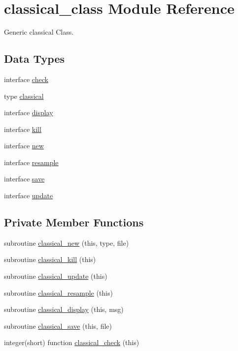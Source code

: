 \hypertarget{classclassical__class}{\section{classical\-\_\-class Module Reference}
\label{classclassical__class}
}


Generic classical Class.  


\subsection*{Data Types}
\begin{DoxyCompactItemize}
\item 
interface \hyperlink{interfaceclassical__class_1_1check}{check}
\item 
type \hyperlink{structclassical__class_1_1classical}{classical}
\item 
interface \hyperlink{interfaceclassical__class_1_1display}{display}
\item 
interface \hyperlink{interfaceclassical__class_1_1kill}{kill}
\item 
interface \hyperlink{interfaceclassical__class_1_1new}{new}
\item 
interface \hyperlink{interfaceclassical__class_1_1resample}{resample}
\item 
interface \hyperlink{interfaceclassical__class_1_1save}{save}
\item 
interface \hyperlink{interfaceclassical__class_1_1update}{update}
\end{DoxyCompactItemize}
\subsection*{Private Member Functions}
\begin{DoxyCompactItemize}
\item 
subroutine \hyperlink{classclassical__class_a6e5dda0e17a3e5cb552a289231d488fd}{classical\-\_\-new} (this, type, file)
\item 
subroutine \hyperlink{classclassical__class_a88946a9bda2bac6d08860b7d96cf5219}{classical\-\_\-kill} (this)
\item 
subroutine \hyperlink{classclassical__class_afb802bbd3f8834f449275a0bdab55677}{classical\-\_\-update} (this)
\item 
subroutine \hyperlink{classclassical__class_a9b5ff74fe77b1370f4ca34d3bb3783c9}{classical\-\_\-resample} (this)
\item 
subroutine \hyperlink{classclassical__class_ac2d45f3adc9cbe9dcf22b9905ba1f649}{classical\-\_\-display} (this, msg)
\item 
subroutine \hyperlink{classclassical__class_a961b68acb4e6f345ae596a8424866657}{classical\-\_\-save} (this, file)
\item 
integer(short) function \hyperlink{classclassical__class_ab91ea3d44c25f7d544b297e0b1a4f00a}{classical\-\_\-check} (this)
\end{DoxyCompactItemize}



